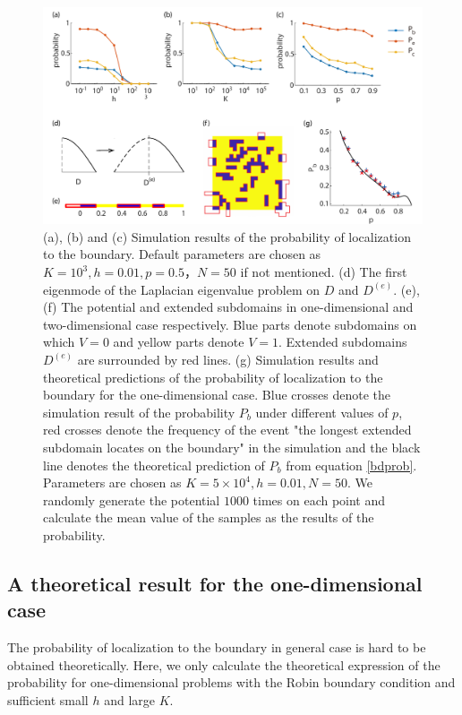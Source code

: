 \documentclass[a4paper,11pt]{article}
\begin{document}
\begin{figure}
\centering
\includegraphics[width=\linewidth]{Fig3}
\caption{(a), (b) and (c) Simulation results of the probability of localization to the boundary. Default parameters are chosen as $K = 10^3, h = 0.01, p = 0.5， N= 50$ if not mentioned. (d) The first eigenmode of the Laplacian eigenvalue problem on $D$ and $D^{(e)}$. (e), (f) The potential and extended subdomains in one-dimensional and two-dimensional case respectively. Blue parts denote subdomains on which $V = 0$ and yellow parts denote $V = 1$. Extended subdomains $D^{(e)}$ are surrounded by red lines. (g) Simulation results and theoretical predictions of the probability of localization to the boundary for the one-dimensional case. Blue crosses denote the simulation result of the probability $P_b$ under different values of $p$, red crosses denote the frequency of the event "the longest extended subdomain locates on the boundary" in the simulation and the black line denotes the theoretical prediction of $P_b$ from equation \eqref{bdprob}. Parameters are chosen as $K = 5 \times 10^4, h = 0.01, N = 50$. We randomly generate the potential $1000$ times on each point and calculate the mean value of the samples as the results of the probability.}
\label{fig3}
\end{figure}

\subsection{A theoretical result for the one-dimensional case}

The probability of localization to the boundary in general case is hard to be obtained theoretically. Here, we only calculate the theoretical expression of the probability for one-dimensional problems with the Robin boundary condition and sufficient small $h$ and large $K$.
\end{document}
